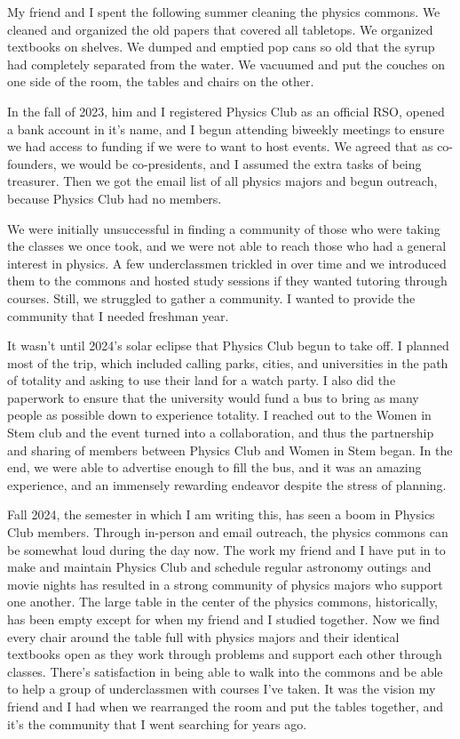 \documentclass[11pt]{article}
\begin{document}
My friend and I spent the following summer cleaning the physics commons. We cleaned and organized the old papers that covered all tabletops. We organized textbooks on shelves. We dumped and emptied pop cans so old that the syrup had completely separated from the water. We vacuumed and put the couches on one side of the room, the tables and chairs on the other.

In the fall of 2023, him and I registered Physics Club as an official RSO, opened a bank account in it's name, and I begun attending biweekly meetings to ensure we had access to funding if we were to want to host events. We agreed that as co-founders, we would be co-presidents, and I assumed the extra tasks of being treasurer. Then we got the email list of all physics majors and begun outreach, because Physics Club had no members.

We were initially unsuccessful in finding a community of those who were taking the classes we once took, and we were not able to reach those who had a general interest in physics. A few underclassmen trickled in over time and we introduced them to the commons and hosted study sessions if they wanted tutoring through courses. Still, we struggled to gather a community. I wanted to provide the community that I needed freshman year.

It wasn't until 2024's solar eclipse that Physics Club begun to take off. I planned most of the trip, which included calling parks, cities, and universities in the path of totality and asking to use their land for a watch party. I also did the paperwork to ensure that the university would fund a bus to bring as many people as possible down to experience totality. I reached out to the Women in Stem club and the event turned into a collaboration, and thus the partnership and sharing of members between Physics Club and Women in Stem began. In the end, we were able to advertise enough to fill the bus, and it was an amazing experience, and an immensely rewarding endeavor despite the stress of planning.

Fall 2024, the semester in which I am writing this, has seen a boom in Physics Club members. Through in-person and email outreach, the physics commons can be somewhat loud during the day now. The work my friend and I have put in to make and maintain Physics Club and schedule regular astronomy outings and movie nights has resulted in a strong community of physics majors who support one another. The large table in the center of the physics commons, historically, has been empty except for when my friend and I studied together. Now we find every chair around the table full with physics majors and their identical textbooks open as they work through problems and support each other through classes. There's satisfaction in being able to walk into the commons and be able to help a group of underclassmen with courses I've taken. It was the vision my friend and I had when we rearranged the room and put the tables together, and it's the community that I went searching for years ago.
\end{document}
